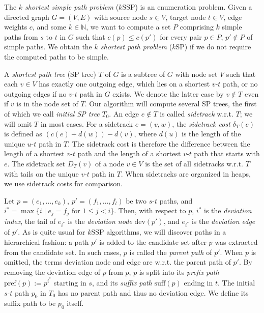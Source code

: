 \documentclass[runningheads,a4paper]{llncs}
\newcommand{\dev}{\text{dev}}
\newcommand{\dist}{d}
\newcommand{\pref}{\text{pref}}
\newcommand{\suff}{\text{suff}}
\begin{document}
The \emph{$k$ shortest simple path problem} ($k$SSP) is an enumeration problem.
Given a directed graph $G = (V, E)$ with source node $s \in V$, target node $t \in V$, edge weights $c$, and some $k \in \mathbb N$, we want to compute a set $P$ comprising $k$ simple paths from $s$ to $t$ in $G$ such that $c(p) \le c(p')$ for every pair $p \in P$, $p' \notin P$ of simple paths.
We obtain the \emph{$k$ shortest path problem} ($k$SP) if we do not require the computed paths to be simple.

A \emph{shortest path tree} (SP tree) $T$ of $G$ is a subtree of $G$ with node set $V$ such that each $v \in V$ has exactly one outgoing edge, which lies on a shortest $v$-$t$ path, or no outgoing edges if no $v$-$t$ path in $G$ exists.
We denote the latter case by $v \notin T$ even if $v$ is in the node set of $T$.
Our algorithm will compute several SP trees, the first of which we call \emph{initial SP tree} $T_0$.
An edge $e \notin T$ is called \emph{sidetrack} w.r.t. $T$; we will omit $T$ in most cases.
For a sidetrack $e = (v, w)$, the \emph{sidetrack cost} $\delta_T(e)$ is defined as $(c(e) + \dist(w)) - \dist(v)$, where $\dist(u)$ is the length of the unique $u$-$t$ path in $T$.
The sidetrack cost is therefore the difference between the length of a shortest $v$-$t$ path and the length of a shortest $v$-$t$ path that starts with $e$.
The sidetrack set $D_T(v)$ of a node $v \in V$ is the set of all sidetracks w.r.t. $T$ with tails on the unique $v$-$t$ path in $T$.
When sidetracks are organized in heaps, we use sidetrack costs for comparison.

Let $p = (e_1, \ldots, e_k)$, $p' = (f_1, \ldots, f_l)$ be two $s$-$t$ paths, and $i^* = \max \{ i \mid e_j = f_j \text{ for } 1 \le j < i \}$.
Then, with respect to $p$, $i^*$ is the \emph{deviation index}, the tail of $e_{i^*}$ is the \emph{deviation node} $\dev(p')$, and $e_{i^*}$ is the \emph{deviation edge} of $p'$.
As is quite usual for $k$SSP algorithms, we will discover paths in a hierarchical fashion: a path $p'$ is added to the candidate set after $p$ was extracted from the candidate set.
In such cases, $p$ is called the \emph{parent path} of $p'$.
When $p$ is omitted, the terms deviation node and edge are w.r.t. the parent path of $p'$.
By removing the deviation edge of $p$ from $p$, $p$ is split into its \emph{prefix path} $\pref(p) := p^{i^*}$ starting in $s$, and its \emph{suffix path} $\suff(p)$ ending in $t$.
The initial $s$-$t$ path $p_0$ in $T_0$ has no parent path and thus no deviation edge.
We define its suffix path to be $p_0$ itself.
\end{document}
